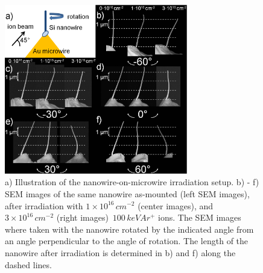 \documentclass[12pt,
paper=a4,				
DIV=calc,		  %
BCOR=16mm,	  %
headinclude,
openany
]{scrbook}
\begin{document}
\begin{figure}[htbp]
	\centering
		\includegraphics[width=8cm]{images/reverseangle.jpg}
	\caption{ a) Illustration of the nanowire-on-microwire irradiation setup. b) - f) SEM images of the same nanowire as-mounted (left SEM images), after irradiation with $1\times10^{16}\,cm^{-2}$  (center images), and $3\times10^{16}\,cm^{-2}$ (right images) $\,100\,keV Ar^+$ ions. The SEM images where taken with the nanowire rotated by the indicated angle from an angle perpendicular to the angle of rotation. The length of the nanowire after irradiation is determined in b) and f) along the dashed lines.}
	\label{reverseangle}
\end{figure}
\end{document}
